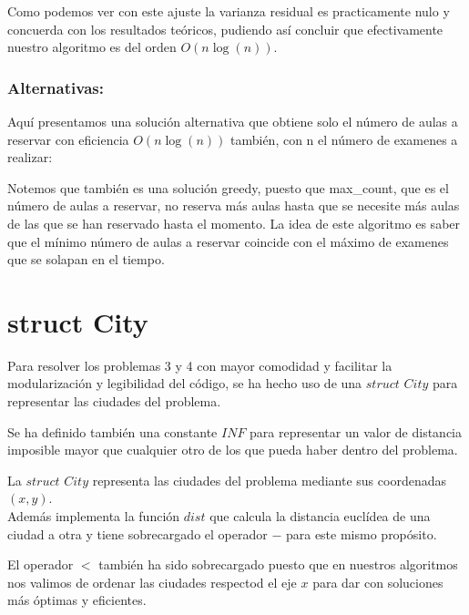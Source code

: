 \documentclass{article}
\begin{document}
    Como podemos ver con este ajuste la varianza residual es practicamente nulo y concuerda con los resultados teóricos, pudiendo así concluir que efectivamente nuestro algoritmo es del orden $O(n\log(n))$.

    \subsubsection{Alternativas: }
    Aquí presentamos una solución alternativa que obtiene solo el número de aulas a reservar con eficiencia $O(n \log (n))$ también, con n el número de examenes a realizar: 
    
    

    Notemos que también es una solución greedy, puesto que max\_count, que es el número de aulas a reservar, no reserva más aulas hasta que se necesite más aulas de las que se han reservado hasta el momento. 
    La idea de este algoritmo es saber que el mínimo número de aulas a reservar coincide con el máximo de examenes que se solapan en el tiempo. 
    
\newpage
\section{struct City}

Para resolver los problemas 3 y 4 con mayor comodidad y facilitar la modularización y legibilidad del código, se ha hecho uso de una  $struct$ $City$ para representar las ciudades del problema.

Se ha definido también una constante $INF$ para representar un valor de distancia imposible mayor que cualquier otro de los que pueda haber dentro del problema.

%

La $struct$ $City$ representa las ciudades del problema mediante sus coordenadas $(x,y)$.\\

Además implementa la función $dist$ que calcula la distancia euclídea de una ciudad a otra y tiene sobrecargado el operador $-$ para este mismo propósito.


El operador $<$ también ha sido sobrecargado puesto que en nuestros algoritmos nos valimos de ordenar las ciudades respectod el eje $x$ para dar con soluciones más óptimas y eficientes.
\end{document}
